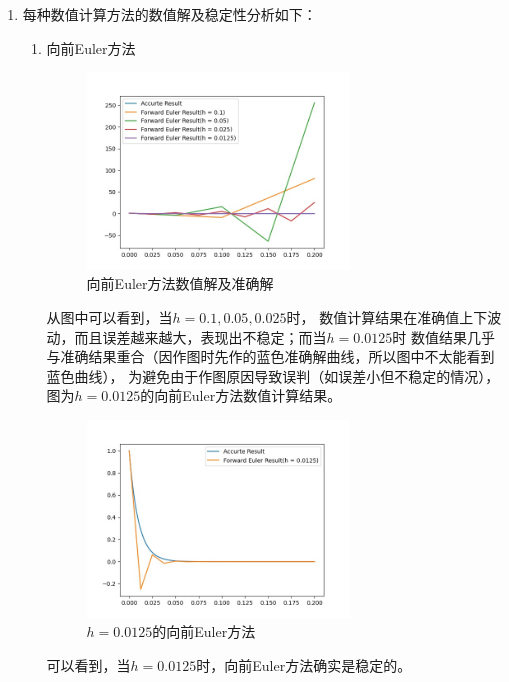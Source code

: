 \documentclass{article}
\begin{document}
\begin{enumerate}
    \item 每种数值计算方法的数值解及稳定性分析如下：
    \begin{enumerate}
        \item 向前Euler方法
        \begin{figure}[H]
            \centering
            \includegraphics[width=0.7\textwidth]{../fig/forward_euler.jpg}
            \caption{向前Euler方法数值解及准确解}
            \label{forward_euler}
        \end{figure}
        从图中可以看到，当$h = 0.1, 0.05, 0.025$时，
        数值计算结果在准确值上下波动，而且误差越来越大，表现出不稳定；而当$h = 0.0125$时
        数值结果几乎与准确结果重合（因作图时先作的蓝色准确解曲线，所以图中不太能看到蓝色曲线），
        为避免由于作图原因导致误判（如误差小但不稳定的情况），
        图为$h = 0.0125$的向前Euler方法数值计算结果。
        \begin{figure}[H]
            \centering
            \includegraphics[width=0.7\textwidth]{../fig/forward_euler_h_0.0125.jpg}
            \caption{$h = 0.0125$的向前Euler方法}
            \label{forward_euler_0.0125}
        \end{figure}
        可以看到，当$h = 0.0125$时，向前Euler方法确实是稳定的。


\end{enumerate}
\end{enumerate}
\end{document}
